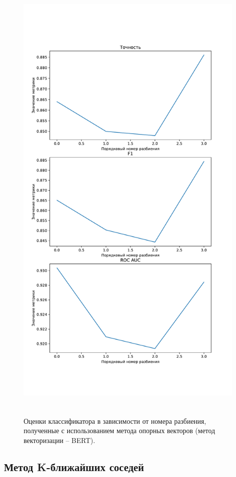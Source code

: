 \begin{figure}[H]
	\centering
	\includegraphics[height=23cm]{inc/plots/svcMetricsBert.pdf}
	\caption{ Оценки классификатора в зависимости от номера разбиения, полученные с использованием метода опорных векторов (метод векторизации -- BERT). }
	\label{img:svcMetricsBert}
\end{figure}



\subsection{Метод K-ближайших соседей }

